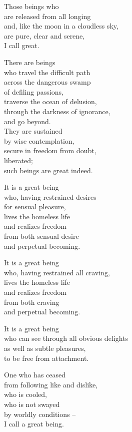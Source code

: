 Those beings who\\
are released from all longing\\
and, like the moon in a cloudless sky,\\
are pure, clear and serene,\\
I call great.


There are beings\\
who travel the difficult path\\
across the dangerous swamp\\
of defiling passions,\\
traverse the ocean of delusion,\\
through the darkness of ignorance,\\
and go beyond.\\
They are sustained\\
by wise contemplation,\\
secure in freedom from doubt,\\
liberated;\\
such beings are great indeed.


It is a great being\\
who, having restrained desires\\
for sensual pleasure,\\
lives the homeless life\\
and realizes freedom\\
from both sensual desire\\
and perpetual becoming.


It is a great being\\
who, having restrained all craving,\\
lives the homeless life\\
and realizes freedom\\
from both craving\\
and perpetual becoming.


It is a great being\\
who can see through all obvious delights\\
as well as subtle pleasures,\\
to be free from attachment.


One who has ceased \\
from following like and dislike,\\
who is cooled,\\
who is not swayed \\
by worldly conditions --\\
I call a great being.


